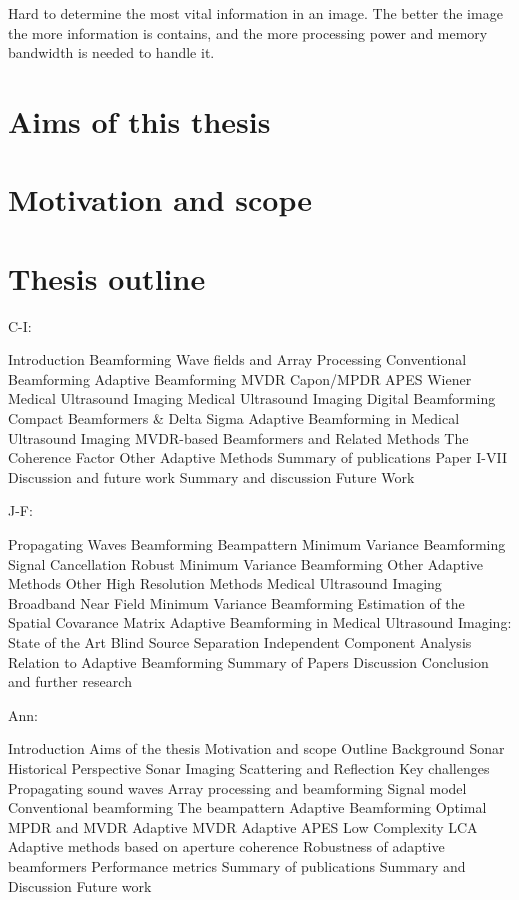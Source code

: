Hard to determine the most vital information in an image. The better the image the more information is contains, and the more processing power and memory bandwidth is needed to handle it.



\section{Aims of this thesis}

\section{Motivation and scope}

\section{Thesis outline}

C-I:

Introduction
   Beamforming
   Wave fields and Array Processing
   Conventional Beamforming
   Adaptive Beamforming
      MVDR
      Capon/MPDR
      APES
      Wiener
   Medical Ultrasound Imaging
   Medical Ultrasound Imaging
   Digital Beamforming
      Compact Beamformers \& Delta Sigma
      Adaptive Beamforming in Medical Ultrasound Imaging
         MVDR-based Beamformers and Related Methods
         The Coherence Factor
         Other Adaptive Methods
Summary of publications
   Paper I-VII
Discussion and future work
   Summary and discussion
   Future Work

   
J-F:

Propagating Waves
Beamforming
  Beampattern
Minimum Variance Beamforming
  Signal Cancellation
  Robust Minimum Variance Beamforming
  Other Adaptive Methods
  Other High Resolution Methods
Medical Ultrasound Imaging
  Broadband Near Field Minimum Variance Beamforming
  Estimation of the Spatial Covarance Matrix
Adaptive Beamforming in Medical Ultrasound Imaging: State of the Art
Blind Source Separation
  Independent Component Analysis
  Relation to Adaptive Beamforming
Summary  of Papers
Discussion
Conclusion and further research

Ann:

Introduction
   Aims of the thesis
   Motivation and scope
   Outline
Background
   Sonar
      Historical Perspective
      Sonar Imaging
      Scattering and Reflection
      Key challenges
   Propagating sound waves
   Array processing and beamforming
      Signal model
      Conventional beamforming
      The beampattern
   Adaptive Beamforming
      Optimal MPDR and MVDR
      Adaptive MVDR
      Adaptive APES
      Low Complexity LCA
      Adaptive methods based on aperture coherence
      Robustness of adaptive beamformers
   Performance metrics
Summary of publications
Summary and Discussion
Future work

